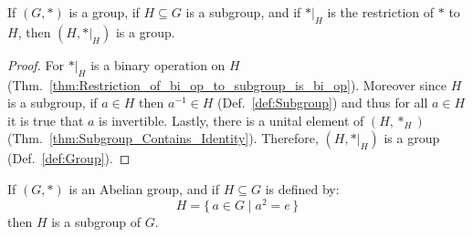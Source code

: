         \begin{theorem}
            If $(G,*)$ is a group, if $H\subseteq{G}$ is a subgroup, and if
            $*|_{H}$ is the restriction of $*$ to $H$, then $(H,*|_{H})$ is a
            group.
        \end{theorem}
        \begin{proof}
            For $*|_{H}$ is a binary operation on $H$
            (Thm.~\ref{thm:Restriction_of_bi_op_to_subgroup_is_bi_op}). Moreover
            since $H$ is a subgroup, if $a\in{H}$ then $a^{\minus{1}}\in{H}$
            (Def.~\ref{def:Subgroup}) and thus for all $a\in{H}$ it is true that
            $a$ is invertible. Lastly, there is a unital element of $(H,*_{H})$
            (Thm.~\ref{thm:Subgroup_Contains_Identity}). Therefore,
            $(H,*|_{H})$ is a group (Def.~\ref{def:Group}).
        \end{proof}
        \begin{theorem}
            If $(G,*)$ is an Abelian group, and if $H\subseteq{G}$ is defined
            by:
            \begin{equation}
                H=\big\{\,a\in{G}\;|\;a^{2}=e\,\big\}
            \end{equation}
            then $H$ is a subgroup of $G$.
        \end{theorem}
